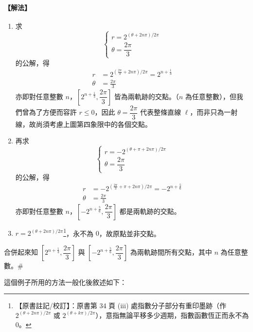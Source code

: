 \paragraph{【解法】}
\begin{enumerate}[label=(\roman*), leftmargin=2.5em]
\item 求
\[
\begin{cases}
r = 2^{(\theta + 2n\pi) / 2\pi} \\[4pt]
\theta = \dfrac{2\pi}{3}
\end{cases}
\]
的公解，得
\[
\begin{aligned}
r &= 2^{(\frac{2\pi}{3} + 2n\pi) / 2\pi} = 2^{n + \frac{1}{3}} \\[4pt]
\theta &= \frac{2\pi}{3}
\end{aligned}
\]
亦即對任意整數 $n$，$\left[2^{n + \frac{1}{3}}, \dfrac{2\pi}{3}\right]$ 皆為兩軌跡的交點。（$n$ 為任意整數），但我們曾為了方便而容許 $r \le 0$，因此 $\theta = \dfrac{2\pi}{3}$ 代表整條直線 $\ell$，而非只為一射線，故尚須考慮上圖第四象限中的各個交點。

\item 再求
\[
\begin{cases}
r = -2^{(\theta + \pi + 2n\pi) / 2\pi} \\[4pt]
\theta = \dfrac{2\pi}{3}
\end{cases}
\]
的公解，得
\[
\begin{aligned}
r &= -2^{(\frac{2\pi}{3} + \pi + 2n\pi) / 2\pi} = -2^{n + \frac{5}{6}} \\[4pt]
\theta &= \frac{2\pi}{3}
\end{aligned}
\]
亦即對任意整數 $n$，$\left[-2^{n + \frac{5}{6}}, \dfrac{2\pi}{3}\right]$ 都是兩軌跡的交點。

\item $r = 2^{(\theta + 2n\pi) / 2\pi}$\label{note:b5s-ch1-p38-exp}\footnote{【原書註記/校訂】：原書第 34 頁 (iii) 處指數分子部分有重印墨跡（作 $2^{(\theta + 2n\pi)/2\pi}$ 或 $2^{(\theta + k\pi)/2\pi}$），意指無論平移多少週期，指數函數恆正而永不為 $0$。}，永不為 $0$，故原點並非交點。
\end{enumerate}

合併起來知 $\left[2^{n + \frac{1}{3}}, \dfrac{2\pi}{3}\right]$ 與 $\left[-2^{n + \frac{5}{6}}, \dfrac{2\pi}{3}\right]$ 為兩軌跡間所有交點，其中 $n$ 為任意整數。\hfill$\#$

\medskip
這個例子所用的方法一般化後敘述如下：

